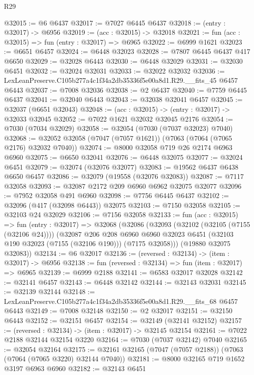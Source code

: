 \begin{lexlean}{R29}
\begin{coremodule}
@32015 := @6 @6437
@32017 := @7027 @6445 @6437
@32018 := (entry : @32017) -> @6956
@32019 := (acc : @32015) -> @32018
@32021 := fun (acc : @32015) => fun (entry : @32017) => @6965
@32022 := @6999 @1621
@32023 := @6651 @6457
@32024 := @6448 @32023
@32028 := @7807 @6445 @6437 @417 @6650
@32029 := @32028 @6443
@32030 := @6448 @32029
@32031 := @32030 @6451
@32032 := @32024 @32031
@32033 := @32022 @32032
@32036 := LexLeanPreserve.C105b277a4c1f34a2db35336f5e00a8d1.R29.__fits_45 @6457 @6443
@32037 := @7008 @32036
@32038 := @2 @6437
@32040 := @7759 @6445 @6437
@32041 := @32040 @6443
@32043 := @32038 @32041 @6457
@32045 := @32037 (@6651 @32043)
@32048 := (acc : @32015) -> (entry : @32017) -> @32033 @32045
@32052 := @7022 @1621 @32032 @32045 @2176
@32054 := @7030 (@7034 @32029)
@32058 := @32054 (@7030 (@7037 @32023) @7040)
@32068 := @32052 @32058 (@7047 (@7057 @1621)) (@7063 (@7064 (@7065 @2176) @32032 @7040))
@32074 := @8000 @32058 @719 @26 @2174 @6963 @6960
@32075 := @6650 @32041
@32076 := @6448 @32075
@32077 := @32024 @6451
@32079 := @32074 (@32076 @32077)
@32083 := @19562 @6437 @6438 @6650 @6457
@32086 := @32079 (@19558 (@32076 @32083))
@32087 := @7117 @32058
@32093 := @32087 @2172 @209 @6960 @6962 @32075 @32077
@32096 := @7952 @32058 @491 @6960
@32098 := @7756 @6445 @6437
@32102 := @32096 (@417 (@32098 @6443)) @32075
@32103 := @7150 @32058
@32105 := @32103 @24 @32029
@32106 := @7156 @32058
@32133 := fun (acc : @32015) =>
  fun (entry : @32017) =>
  @32068
    (@32086
      (@32093
        (@32102 (@32105 (@7155 (@32106 @24))))
        (@32087
          @206
          @208
          @6960
          @6960
          @32023
          @6451
          (@32103 @190 @32023 (@7155 (@32106 @190)))
          (@7175 @32058)))
      (@19880 @32075 @32083))
@32134 := @6 @32017
@32136 := (reversed : @32134) -> (item : @32017) -> @6956
@32138 := fun (reversed : @32134) => fun (item : @32017) => @6965
@32139 := @6999 @2188
@32141 := @6583 @32017 @32028
@32142 := @32141 @6457
@32143 := @6448 @32142
@32144 := @32143 @32031
@32145 := @32139 @32144
@32148 := LexLeanPreserve.C105b277a4c1f34a2db35336f5e00a8d1.R29.__fits_68 @6457 @6443
@32149 := @7008 @32148
@32150 := @2 @32017
@32151 := @32150 @6443
@32152 := @32151 @6457
@32154 := @32149 (@32141 @32152)
@32157 := (reversed : @32134) -> (item : @32017) -> @32145 @32154
@32161 := @7022 @2188 @32144 @32154 @3220
@32164 := @7030 (@7037 @32142) @7040
@32165 := @32054 @32164
@32175 := @32161 @32165 (@7047 (@7057 @2188)) (@7063 (@7064 (@7065 @3220) @32144 @7040))
@32181 := @8000 @32165 @719 @1652 @3197 @6963 @6960
@32182 := @32143 @6451

\end{coremodule}
\end{lexlean}

